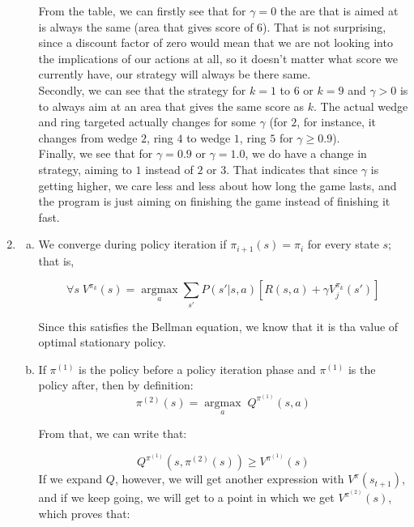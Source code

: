 \documentclass{article}
\begin{document}
\begin{enumerate}
\begin{enumerate}[(a)]
From the table, we can firstly see that for $\gamma=0$ the are that is aimed at is always the same (area that gives score of $6$). That is not surprising, since a discount factor of zero would mean that we are not looking into the implications of our actions at all, so it doesn't matter what score we currently have, our strategy will always be there same.\\

Secondly, we can see that the strategy for $k=1$ to $6$ or $k=9$ and $\gamma>0$ is to always aim at an area that gives the same score as $k$. The actual wedge and ring targeted actually changes for some $\gamma$ (for $2$, for instance, it changes from wedge $2$, ring $4$ to wedge $1$, ring $5$ for $\gamma\ge0.9$).\\

Finally, we see that for $\gamma=0.9$ or $\gamma=1.0$, we do have a change in strategy,  aiming to $1$ instead of $2$ or $3$. That indicates that since $\gamma$ is getting higher, we care less and less about how long the game lasts, and the program is just aiming on finishing the game instead of finishing it fast.
            \end{enumerate}        
        \item
            \begin{enumerate}[(a)]
                \item We converge during policy iteration if $\pi_{i+1}(s) = \pi_{i}$ for every state $s$; that is, 

                $$\forall s \; V^{\pi_k}(s) = \underset{a}{\operatorname{argmax}} \sum_{s'} P(s' | s, a) [R(s, a) + \gamma V_j^{\pi_k}(s')]$$

                Since this satisfies the Bellman equation, we know that it is tha value of optimal stationary policy.
                \item If $\pi^{(1)}$ is the policy before a policy iteration phase and $\pi^{(1)}$ is the policy after, then by definition: $$\pi^{(2)}(s) = \underset{a}{\operatorname{argmax}} \; Q^{\pi^{(1)}}(s, a)$$
                
               From that, we can write that:
               
               $$Q^{\pi^{(1)}}(s, \pi^{(2)}(s))\geq V^{\pi^{(1)}}(s)$$
 If we expand $Q$, however, we will get another expression with $V^{\pi}(s_{t+1})$, and if we keep going, we will get to a point in which we get $V^{\pi^{(2)}}(s)$, which proves that:
 

\end{enumerate}
\end{enumerate}
\end{document}
